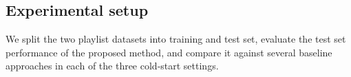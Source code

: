 


\subsection{Experimental setup}

We split the two playlist datasets into training and test set, %
evaluate the test set performance of the proposed method,
and compare it against
several baseline approaches
in each of the three cold-start settings.


